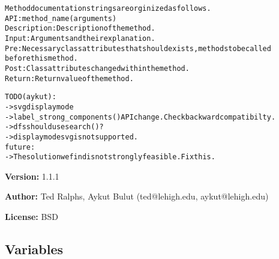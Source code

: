 \begin{alltt}
Method documentation strings are orginized as follows.
API: method\_name(arguments)
Description: Description of the method.
Input: Arguments and their explanation.
Pre: Necessary class attributes that should exists, methods to be called
     before this method.
Post: Class attributes changed within the method.
Return: Return value of the method.

TODO(aykut):
-{\textgreater} svg display mode
-{\textgreater} label\_strong\_components() API change. Check backward compatibilty.
-{\textgreater} dfs should use search()?
-{\textgreater} display mode svg is not supported.
future:
-{\textgreater} The solution we find is not strongly feasible. Fix this.
\end{alltt}

\textbf{Version:} 1.1.1



\textbf{Author:} Ted Ralphs, Aykut Bulut (ted@lehigh.edu, aykut@lehigh.edu)



\textbf{License:} BSD





  \subsection{Variables}

